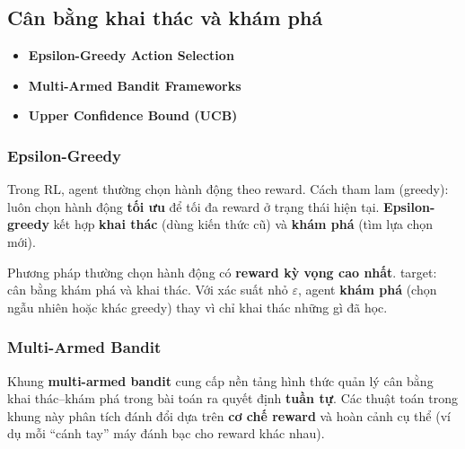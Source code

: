 \subsection{Cân bằng khai thác và khám phá}

\begin{phuongphap}[title={Các kỹ thuật cân bằng}]
\begin{itemize}
  \item \textbf{Epsilon-Greedy Action Selection}
  \item \textbf{Multi-Armed Bandit Frameworks}
  \item \textbf{Upper Confidence Bound (UCB)}
\end{itemize}
\end{phuongphap}

\subsubsection{Epsilon-Greedy}

\begin{phuongphap}[title={Epsilon-Greedy Action Selection}]
Trong RL, agent thường chọn hành động theo reward.
Cách tham lam (greedy): luôn chọn hành động \textbf{tối ưu} để tối đa reward ở trạng thái hiện tại.
\textbf{Epsilon-greedy} kết hợp \textbf{khai thác} (dùng kiến thức cũ) và \textbf{khám phá} (tìm lựa chọn mới).
\end{phuongphap}

\begin{phuongphap}[title={Cơ chế epsilon-greedy}]
Phương pháp thường chọn hành động có \textbf{reward kỳ vọng cao nhất}.
target: cân bằng khám phá và khai thác.
Với xác suất nhỏ $\varepsilon$, agent \textbf{khám phá} (chọn ngẫu nhiên hoặc khác greedy) thay vì chỉ khai thác những gì đã học.
\end{phuongphap}

\begin{vidu}[title={Minh họa epsilon-greedy}]
\end{vidu}

\subsubsection{Multi-Armed Bandit}

\begin{dinhnghia}[title={Multi-Armed Bandit}]
Khung \textbf{multi-armed bandit} cung cấp nền tảng hình thức quản lý cân bằng khai thác--khám phá trong bài toán ra quyết định \textbf{tuần tự}.
Các thuật toán trong khung này phân tích đánh đổi dựa trên \textbf{cơ chế reward} và hoàn cảnh cụ thể (ví dụ mỗi ``cánh tay'' máy đánh bạc cho reward khác nhau).
\end{dinhnghia}

